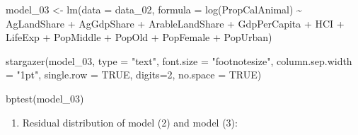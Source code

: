 \documentclass[
  letterpaper,
  DIV=11,
  numbers=noendperiod]{scrartcl}
\newenvironment{Shaded}{\begin{snugshade}}{\end{snugshade}}
\newcommand{\AttributeTok}[1]{\textcolor[rgb]{0.40,0.45,0.13}{#1}}
\newcommand{\ConstantTok}[1]{\textcolor[rgb]{0.56,0.35,0.01}{#1}}
\newcommand{\DecValTok}[1]{\textcolor[rgb]{0.68,0.00,0.00}{#1}}
\newcommand{\FunctionTok}[1]{\textcolor[rgb]{0.28,0.35,0.67}{#1}}
\newcommand{\NormalTok}[1]{\textcolor[rgb]{0.00,0.23,0.31}{#1}}
\newcommand{\OtherTok}[1]{\textcolor[rgb]{0.00,0.23,0.31}{#1}}
\newcommand{\SpecialCharTok}[1]{\textcolor[rgb]{0.37,0.37,0.37}{#1}}
\newcommand{\StringTok}[1]{\textcolor[rgb]{0.13,0.47,0.30}{#1}}
\providecommand{\tightlist}{%
  \setlength{\itemsep}{0pt}\setlength{\parskip}{0pt}}\usepackage{longtable,booktabs,array}
\begin{document}
\begin{Shaded}
\begin{Highlighting}[]
\NormalTok{model\_03 }\OtherTok{\textless{}{-}} \FunctionTok{lm}\NormalTok{(}\AttributeTok{data =}\NormalTok{ data\_02, }
               \AttributeTok{formula =} \FunctionTok{log}\NormalTok{(PropCalAnimal) }\SpecialCharTok{\textasciitilde{}}\NormalTok{ AgLandShare }\SpecialCharTok{+}\NormalTok{ AgGdpShare }\SpecialCharTok{+} 
\NormalTok{                 ArableLandShare }\SpecialCharTok{+}\NormalTok{ GdpPerCapita }\SpecialCharTok{+}\NormalTok{ HCI }\SpecialCharTok{+}\NormalTok{ LifeExp }\SpecialCharTok{+}\NormalTok{ PopMiddle }\SpecialCharTok{+}
\NormalTok{                 PopOld }\SpecialCharTok{+}\NormalTok{ PopFemale }\SpecialCharTok{+}\NormalTok{ PopUrban)}

\FunctionTok{stargazer}\NormalTok{(model\_03, }\AttributeTok{type =} \StringTok{"text"}\NormalTok{, }\AttributeTok{font.size =} \StringTok{"footnotesize"}\NormalTok{, }
          \AttributeTok{column.sep.width =} \StringTok{"1pt"}\NormalTok{, }\AttributeTok{single.row =} \ConstantTok{TRUE}\NormalTok{,}
          \AttributeTok{digits=}\DecValTok{2}\NormalTok{, }\AttributeTok{no.space =} \ConstantTok{TRUE}\NormalTok{)}

\FunctionTok{bptest}\NormalTok{(model\_03)}
\end{Highlighting}
\end{Shaded}

\begin{enumerate}
\def\labelenumi{\arabic{enumi}.}
\setcounter{enumi}{3}
\tightlist
\item
  Residual distribution of model (2) and model (3):
\end{enumerate}
\end{document}
